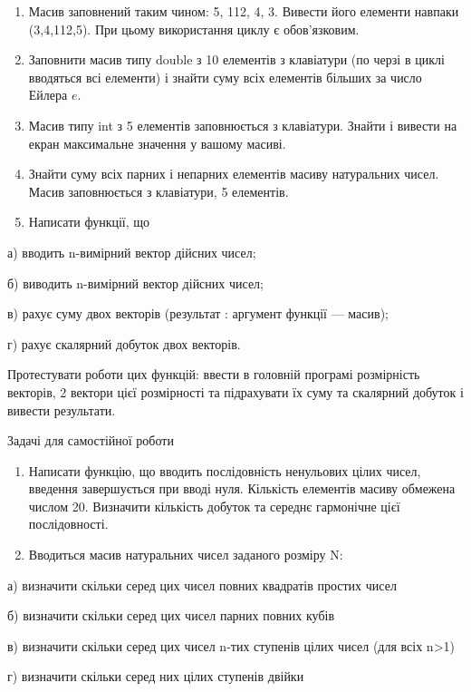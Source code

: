 \documentclass[]{article}
\begin{document}
\begin{enumerate}
\def\labelenumi{\arabic{enumi})}
\item
  Масив заповнений таким чином: 5, 112, 4, 3. Вивести його елементи
  навпаки (3,4,112,5). При цьому використання циклу є обов'язковим.
\item
  Заповнити масив типу double з 10 елементів з клавіатури (по черзі в
  циклі вводяться всі елементи) і знайти суму всіх елементів більших за
  число Ейлера \(e\).
\item
  Масив типу int з 5 елементів заповнюється з клавіатури. Знайти і
  вивести на екран максимальне значення у вашому масиві.
\item
  Знайти суму всіх парних і непарних елементів масиву натуральних чисел.
  Масив заповнюється з клавіатури, 5 елементів.
\item
  \protect\hypertarget{_Hlk65236602}{}{}Написати функції, що
\end{enumerate}

а) вводить n-вимірний вектор дійсних чисел;

б) виводить n-вимірний вектор дійсних чисел;

в) рахує суму двох векторів (результат : аргумент функції --- масив);

г) рахує скалярний добуток двох векторів.

Протестувати роботи цих функцій: ввести в головній програмі розмірність
векторів, 2 вектори цієї розмірності та підрахувати їх суму та скалярний
добуток і вивести результати.

Задачі для самостійної роботи

\begin{enumerate}
\def\labelenumi{\arabic{enumi})}
\item
  Написати функцію, що вводить послідовність ненульових цілих чисел,
  введення завершується при вводі нуля. Кількість елементів масиву
  обмежена числом 20. Визначити кількість добуток та середнє гармонічне
  цієї послідовності.
\item
  Вводиться масив натуральних чисел заданого розміру N:
\end{enumerate}

а) визначити скільки серед цих чисел повних квадратів простих чисел

б) визначити скільки серед цих чисел парних повних кубів

в) визначити скільки серед цих чисел n-тих ступенів цілих чисел (для
всіх n\textgreater{}1)

г) визначити скільки серед них цілих ступенів двійки
\end{document}
